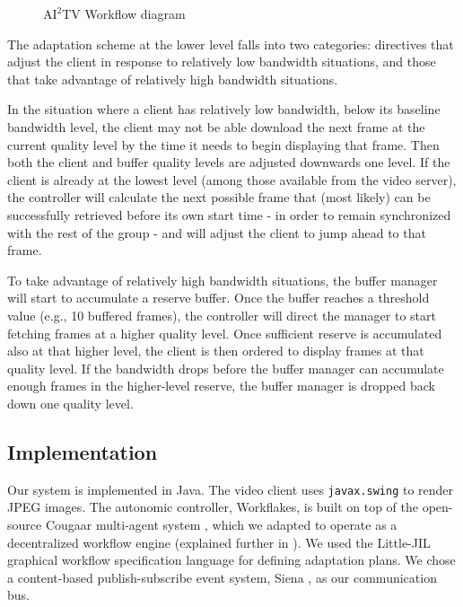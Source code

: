\documentclass{sig-alternate}
\begin{document}
%
%

\begin{figure} 
  \centering
  \hspace*{-5mm}
  \caption{$\mathrm{AI}^2$TV Workflow diagram }
  \label{ljil}
\end{figure}

The adaptation scheme at the lower level falls into two categories:
directives that adjust the client in response to relatively low
bandwidth situations, and those that take advantage of relatively high
bandwidth situations.

In the situation where a client has relatively low bandwidth, below
its baseline bandwidth level, the client may not be able download the
next frame at the current quality level by the time it needs to begin
displaying that frame.  Then both the client and buffer quality levels
are adjusted downwards one level. If the client is already at the
lowest level (among those available from the video server), the
controller will calculate the next possible frame that (most likely)
can be successfully retrieved before its own start time - in order to
remain synchronized with the rest of the group - and will adjust the
client to jump ahead to that frame.

To take advantage of relatively high bandwidth situations, the buffer
manager will start to accumulate a reserve buffer.  Once the buffer
reaches a threshold value (e.g., 10 buffered frames), the controller
will direct the manager to start fetching frames at a higher quality
level.  Once sufficient reserve is accumulated also at that higher
level, the client is then ordered to display frames at that quality
level.  If the bandwidth drops before the buffer manager can
accumulate enough frames in the higher-level reserve, the buffer
manager is dropped back down one quality level.

\subsection{Implementation} \label{implementation}

Our system is implemented in Java. The video client uses
\texttt{javax.swing} to render JPEG images.  The autonomic controller,
Workflakes, is built on top of the open-source Cougaar multi-agent
system \cite{COUGAAR}, which we adapted to operate as a decentralized
workflow engine (explained further in \cite{ICSE}).  We used the
Little-JIL graphical workflow specification language \cite{LJIL} for
defining adaptation plans.  We chose a content-based publish-subscribe
event system, Siena \cite{SIENA}, as our communication bus.
\end{document}
